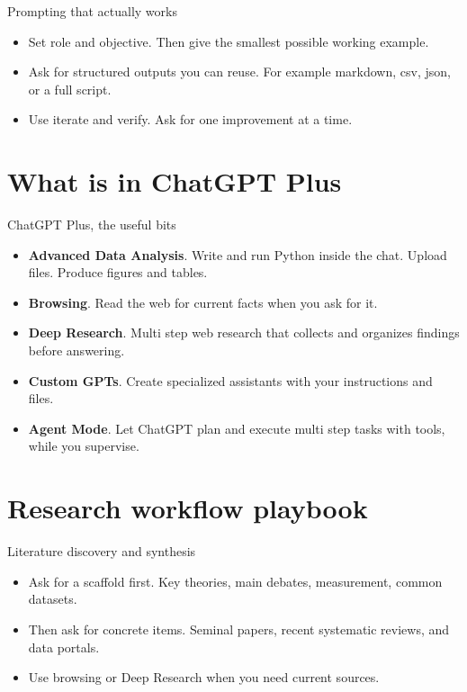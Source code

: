 \documentclass[aspectratio=169,professionalfonts]{beamer}
\newcommand{\feature}[1]{\textbf{#1}}
\begin{document}
\begin{frame}[fragile]{Prompting that actually works}
  \begin{itemize}
    \item Set role and objective. Then give the smallest possible working example.
    \item Ask for structured outputs you can reuse. For example markdown, csv, json, or a full script.
    \item Use iterate and verify. Ask for one improvement at a time.
  \end{itemize}
\end{frame}

\section{What is in ChatGPT Plus}

\begin{frame}{ChatGPT Plus, the useful bits}
  \begin{itemize}
    \item \feature{Advanced Data Analysis}. Write and run Python inside the chat. Upload files. Produce figures and tables.
    \item \feature{Browsing}. Read the web for current facts when you ask for it.
    \item \feature{Deep Research}. Multi step web research that collects and organizes findings before answering.
    \item \feature{Custom GPTs}. Create specialized assistants with your instructions and files.
    \item \feature{Agent Mode}. Let ChatGPT plan and execute multi step tasks with tools, while you supervise.
  \end{itemize}
\end{frame}

\section{Research workflow playbook}

\begin{frame}{Literature discovery and synthesis}
  \begin{itemize}
    \item Ask for a scaffold first. Key theories, main debates, measurement, common datasets.
    \item Then ask for concrete items. Seminal papers, recent systematic reviews, and data portals.
    \item Use browsing or Deep Research when you need current sources.
  \end{itemize}
\end{frame}
\end{document}
